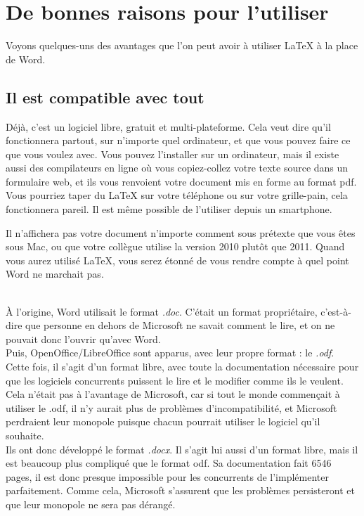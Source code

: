 \documentclass[10pt]{article}
\begin{document}
\section{De bonnes raisons pour l'utiliser}
Voyons quelques-uns des avantages que l'on peut avoir à utiliser LaTeX à la place de Word.

\subsection{Il est compatible avec tout}

Déjà, c'est un logiciel libre, gratuit et multi-plateforme. Cela veut dire qu'il fonctionnera partout, sur n'importe quel ordinateur, et que vous pouvez faire ce que vous voulez avec. Vous pouvez l'installer sur un ordinateur, mais il existe aussi des compilateurs en ligne où vous copiez-collez votre texte source dans un formulaire web, et ils vous renvoient votre document mis en forme au format pdf. Vous pourriez taper du LaTeX sur votre téléphone ou sur votre grille-pain, cela fonctionnera pareil. Il est même possible de l'utiliser depuis un smartphone.

Il n'affichera pas votre document n'importe comment sous prétexte que vous êtes sous Mac, ou que votre collègue utilise la version 2010 plutôt que 2011. Quand vous aurez utilisé LaTeX, vous serez étonné de vous rendre compte à quel point Word ne marchait pas.

\begin{tcolorbox}[breakable]
\\
À l'origine, Word utilisait le format \emph{.doc}. C'était un format propriétaire, c'est-à-dire que personne en dehors de Microsoft ne savait comment le lire, et on ne pouvait donc l'ouvrir qu'avec Word.\\

Puis, OpenOffice/LibreOffice sont apparus, avec leur propre format : le \emph{.odf}. Cette fois, il s'agit d'un format libre, avec toute la documentation nécessaire pour que les logiciels concurrents puissent le lire et le modifier comme ils le veulent.\\

Cela n'était pas à l'avantage de Microsoft, car si tout le monde commençait à utiliser le .odf, il n'y aurait plus de problèmes d'incompatibilité, et Microsoft perdraient leur monopole puisque chacun pourrait utiliser le logiciel qu'il souhaite.\\

Ils ont donc développé le format \emph{.docx}.
Il s'agit lui aussi d'un format libre, mais il est beaucoup plus compliqué que le format odf.
Sa documentation fait 6546 pages, il est donc presque impossible pour les concurrents de l'implémenter parfaitement.
Comme cela, Microsoft s'assurent que les problèmes persisteront et que leur monopole ne sera pas dérangé.
\end{tcolorbox}
\end{document}
